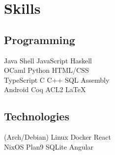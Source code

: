 \documentclass[letterpaper]{resume} %
\begin{document}
\begin{minipage}[t]{0.33\textwidth}

\section{Skills}

\subsection{Programming}

Java \textbullet{} Shell \textbullet{} JavaScript \textbullet{} Haskell \\
OCaml \textbullet{} Python \textbullet{} HTML/CSS \\

TypeScript \textbullet{}  C \textbullet{} C++ \textbullet{} SQL \textbullet{} Assembly \\

Android  \textbullet{} Coq \textbullet{} ACL2 \textbullet{} \LaTeX\ \\

\sectionspace %

\subsection{Technologies}

(Arch/Debian) Linux  \textbullet{} Docker \textbullet{} React \\

NixOS \textbullet{} Plan9 \textbullet{} SQLite \textbullet{} Angular \\

\sectionspace %

\end{minipage} %
\hfill
%
%
\end{document}
